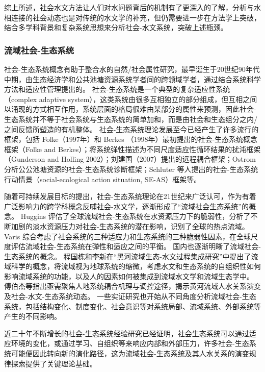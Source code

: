综上所述，社会水文方法让人们对水问题背后的机制有了更深入的了解，分析与水相连接的社会动态也是对传统的水文学的补充，但仍需要进一步在方法学上突破，结合多学科背景和复杂系统思想来分析社会-水文系统，突破上述瓶颈。


\subsubsection*{流域社会-生态系统}

社会-生态系统概念有助于整合水的自然/社会属性研究\cite{fowler2022}，最早诞生于20世纪90年代中期，由生态经济学和公共池塘资源系统学者间的跨领域学者，通过结合系统科学方法和适应性管理提出的\cite{biggs2021}。
社会-生态系统是一个典型的复杂适应性系统（complex adaptive system），这类系统由很多互相独立的部分组成，但互相之间以涌现的方式相互作用，系统层面的格局很难由某部分的属性来预测，因此社会-生态系统并不等于社会系统与生态系统的简单加和，而是由社会和生态组分之内/之间反馈所塑造的有机整体。 %
社会-生态系统理论发展至今已经产生了许多流行的框架，包括 Folke（1997年）和 Berkes （1998年）最初提出的社会-生态系统概念框架（Folke and Berkes）；将系统弹性描述为不同尺度适应性循环结果的扰沌框架（Gunderson and Holling 2002）；刘建国（2007）提出的远程耦合框架；Ostrom 分析公公池塘资源的社会-生态系统诊断框架；Schluter 等人提出的社会-生态系统行动情景（social-ecological action situation, SE-AS）框架等。

随着可持续发展目标的提出，社会-生态系统理论在21世纪来广泛认可，作为有着广泛影响力的跨学科概念反哺社会-水文学，逐渐形成了“流域社会生态系统”的概念。
Huggins 评估了全球流域社会-生态系统在水资源压力下的脆弱性，分析了不断加剧的淡水资源压力对社会-生态系统的潜在影响，识别了全球的热点流域\cite{huggins2022}。
Varis 综合考虑了社会系统的三种适应力和生态系统的三种脆弱性因素，在全球尺度评估流域社会-生态系统在弹性和适应之间的平衡\cite{varis2019}。
国内也逐渐明晰了流域社会-生态系统的概念。
程国栋和李新\cite{cheng2015}在“黑河流域生态-水文过程集成研究”中提出了流域科学的概念，将流域视为地球系统的缩微，考虑水文和生态系统的自组织性如何影响流域系统的功能，以及人的因素如何被集成到流域水文学和流域生态学中。
傅伯杰\cite{fu2017a}等指出亟需聚焦人地系统耦合机理与调控途径，揭示黄河流域人水关系演变及社会-水文-生态系统动态。
一些实证研究也开始从不同角度分析流域社会-生态系统，包括结构变化\cite{song2022}、制度变化\cite{wang2019d}、社会意识\cite{liu2023}等对系统局部、流域系统、外部系统等产生的不同影响。

近二十年不断增长的社会-生态系统经验研究已经证明，社会生态系统可以通过适应环境的变化，或通过学习、自组织等来响应内部和外部压力，许多社会-生态系统可能便因此转向新的演化路径，这为流域社会-生态系统及其人水关系的演变规律探索提供了关键理论基础。  %
